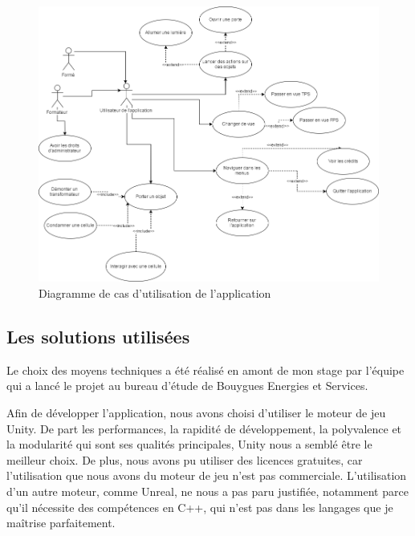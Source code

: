 \documentclass[a4paper]{article}
\begin{document}
    \vfill 
    \begin{figure}[H]
        \centering
        \includegraphics[scale=0.5]{img/UseCases}
        \caption{Diagramme de cas d'utilisation de l'application}
    \end{figure}
    \vfill

    \newpage

    \subsection{Les solutions utilisées}

    Le choix des moyens techniques a été réalisé en amont de mon stage par l'équipe qui a lancé le projet au bureau d'étude de Bouygues Energies et Services. \\ 

    \vfill

    Afin de développer l'application, nous avons choisi d'utiliser le moteur de jeu Unity. De part les performances, la rapidité de développement, la polyvalence et la modularité qui sont ses qualités principales, Unity nous a semblé être le meilleur choix. De plus, nous avons pu utiliser des licences gratuites, car l'utilisation que nous avons du moteur de jeu n'est pas commerciale. L'utilisation d'un autre moteur, comme Unreal, ne nous a pas paru justifiée, notamment parce qu'il nécessite des compétences en C++, qui n'est pas dans les langages que je maîtrise parfaitement. \\
\end{document}
